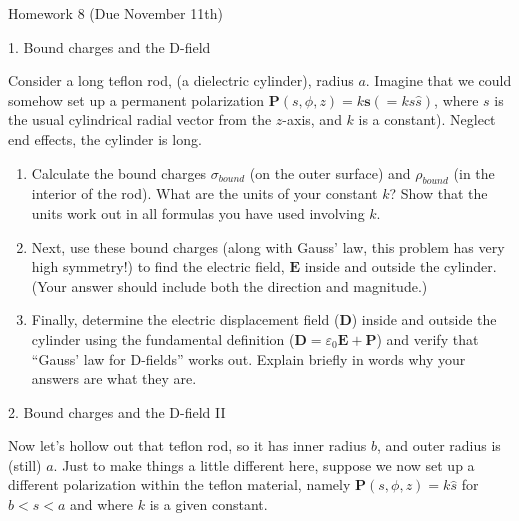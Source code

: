 \documentclass[11pt]{article}
\def\tightlist{}
\begin{document}
{\LARGE Homework 8 (Due November
11th)}\label{homework-8-due-november-11th}

{\Large 1. Bound charges and the
D-field}\label{bound-charges-and-the-d-field}

Consider a long teflon rod, (a dielectric cylinder), radius \(a\).
Imagine that we could somehow set up a permanent polarization
\(\mathbf{P}(s,\phi,z) = k\mathbf{s} ( = ks\hat{s})\), where \(s\) is
the usual cylindrical radial vector from the \(z\)-axis, and \(k\) is a
constant). Neglect end effects, the cylinder is long.

\begin{enumerate}
\def\labelenumi{\arabic{enumi}.}
\tightlist
\item
  Calculate the bound charges \(\sigma_{bound}\) (on the outer surface)
  and \(\rho_{bound}\) (in the interior of the rod). What are the units
  of your constant \(k\)? Show that the units work out in all formulas
  you have used involving \(k\).
\item
  Next, use these bound charges (along with Gauss' law, this problem has
  very high symmetry!) to find the electric field, \(\mathbf{E}\) inside
  and outside the cylinder. (Your answer should include both the
  direction and magnitude.)
\item
  Finally, determine the electric displacement field (\(\mathbf{D}\))
  inside and outside the cylinder using the fundamental definition
  (\(\mathbf{D} = \varepsilon_0 \mathbf{E} + \mathbf{P}\)) and verify
  that ``Gauss' law for D-fields'' works out. Explain briefly in words
  why your answers are what they are.
\end{enumerate}

{\Large 2. Bound charges and the D-field
II}\label{bound-charges-and-the-d-field-ii}

Now let's hollow out that teflon rod, so it has inner radius \(b\), and
outer radius is (still) \(a\). Just to make things a little different
here, suppose we now set up a different polarization within the teflon
material, namely \(\mathbf{P}(s,\phi,z) = k\hat{s}\) for \(b<s<a\) and
where \(k\) is a given constant.
\end{document}
